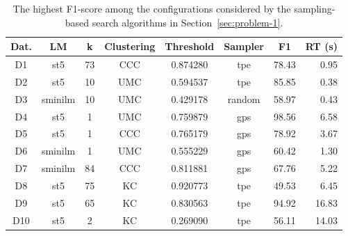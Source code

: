\begin{table}[t]
\centering
\small 
\setlength{\tabcolsep}{2.5pt}
\caption{The highest F1-score among the configurations considered by the sampling-based search algorithms in Section~\ref{sec:problem-1}.}
\label{tab:global-bestf1s}
\begin{tabular}{|c|c|c|c|c|c|c|r|}
\hline
Dat. & LM & k & Clustering & Threshold & Sampler & F1 & RT (s) \\
\hline
\hline
D1 & st5 & 73 & CCC & 0.874280 & tpe & 78.43 & 0.95 \\
D2 & st5 & 10 & UMC & 0.594537 & tpe & 85.85 & 0.38 \\
D3 & sminilm & 10 & UMC & 0.429178 & random & 58.97 & 0.43 \\
D4 & st5 & 1 & UMC & 0.759879 & gps & 98.56 & 6.58 \\
D5 & st5 & 1 & CCC & 0.765179 & gps & 78.92 & 3.67 \\
D6 & sminilm & 1 & UMC & 0.555229 & gps & 60.42 & 1.30 \\
D7 & sminilm & 84 & CCC & 0.811881 & gps & 67.76 & 5.22 \\
D8 & st5 & 75 & KC & 0.920773 & tpe & 49.53 & 6.45 \\
D9 & st5 & 65 & KC & 0.830563 & tpe & 94.92 & 16.83 \\
D10 & st5 & 2 & KC & 0.269090 & tpe & 56.11 & 14.03 \\
\hline
\end{tabular}
\end{table}
